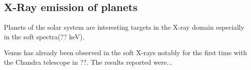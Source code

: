     \subsection{X-Ray emission of planets}  
    Planets of the solar system are interesting targets in the X-ray domain especially in the soft spectra(?? keV).

    Venus has already been observed in the soft X-rays notably for the first time with the Chandra telescope in ??. The results reported were...